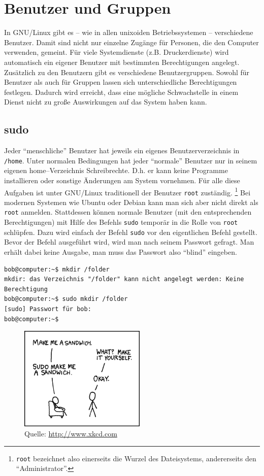 \section {Benutzer und Gruppen}

In GNU/Linux gibt es -- wie in allen unixoiden Betriebssystemen -- verschiedene Benutzer. Damit sind nicht nur einzelne Zugänge für Personen, die den Computer verwenden, gemeint. Für viele Systemdienste (z.B. Druckerdienste) wird automatisch ein eigener Benutzer mit bestimmten Berechtigungen angelegt. Zusätzlich zu den Benutzern gibt es verschiedene Benutzergruppen. Sowohl für Benutzer als auch für Gruppen lassen sich unterschiedliche Berechtigungen festlegen. Dadurch wird erreicht, dass eine mögliche Schwachstelle in einem Dienst nicht zu große Auswirkungen auf das System haben kann.  

\subsection {sudo}
Jeder ``menschliche'' Benutzer hat jeweils ein eigenes Benutzerverzeichnis in \lstinline|/home|. Unter normalen Bedingungen hat jeder ``normale'' Benutzer nur in seinem eigenen home--Verzeichnis Schreibrechte. D.h. er kann keine Programme installieren oder sonstige Änderungen am System vornehmen. Für alle diese Aufgaben ist unter GNU/Linux traditionell der Benutzer \lstinline|root| zuständig. \footnote{\lstinline|root| bezeichnet also einerseits die Wurzel des Dateisystems, andererseits den ``Administrator''.} Bei modernen Systemen wie Ubuntu oder Debian kann man sich aber nicht direkt als \lstinline|root| anmelden. Stattdessen können normale Benutzer (mit den entsprechenden Berechtigungen) mit Hilfe des Befehls \lstinline|sudo| temporär in die Rolle von \lstinline|root| schlüpfen. Dazu wird einfach der Befehl \lstinline|sudo| vor den eigentlichen Befehl gestellt. Bevor der Befehl ausgeführt wird, wird man nach seinem Passwort gefragt. Man erhält dabei keine Ausgabe, man muss das Passwort also ``blind'' eingeben.

\begin{lstlisting}
bob@computer:~$ mkdir /folder
mkdir: das Verzeichnis "/folder" kann nicht angelegt werden: Keine Berechtigung
bob@computer:~$ sudo mkdir /folder
[sudo] Passwort für bob: 
bob@computer:~$ 
\end{lstlisting}

\begin{figure}[H]
 \begin{center}
  \includegraphics[width=6cm,keepaspectratio=true]{sudo.png}
  \caption{Quelle: \url{http://www.xkcd.com}}
 \end{center}
\end{figure}

